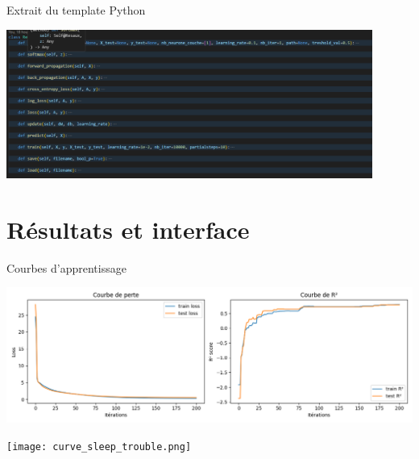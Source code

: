 \documentclass{beamer}
\begin{document}
\begin{frame}{Extrait du template Python}
  \begin{center}
    \includegraphics[width=0.9\textwidth]{screen_class.png}
  \end{center}
\end{frame}

\section{Résultats et interface}

\begin{frame}{Courbes d'apprentissage}
    \begin{center}

      \begin{minipage}{0.7\linewidth}
        \centering
        \includegraphics[width=\linewidth]{curve_sleep_quality.png}
      \end{minipage}

      \begin{minipage}{0.7\linewidth}
        \centering
        \texttt{[image: curve\_sleep\_trouble.png]}
      \end{minipage}
      
    \end{center}
\end{frame}
\end{document}
